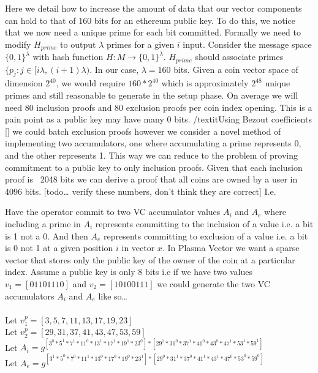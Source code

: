 \documentclass[11pt]{article}
\begin{document}
Here we detail how to increase the amount of data that our vector components can hold to that of 160 bits for an ethereum public key. To do this, we notice that we now need a unique prime for each bit committed. Formally we need to modify $H_{prime}$ to output $\lambda$ primes for a given $i$ input. Consider the message space $\{0,1\}^{\lambda}$ with hash function $H: M \rightarrow \{0,1\}^{\lambda}$. $H_{prime}$ should associate primes $\{p_j: j \in [i\lambda,(i+1)\lambda)$. In our case, $\lambda = 160$ bits. Given a coin vector space of dimension $2^{40}$, we would require $160*2^{40}$ which is approximately $2^{48}$ unique primes and still reasonable to generate in the setup phase. On average we will need 80 inclusion proofs and 80 exclusion proofs per coin index opening. This is a pain point as a public key may have many 0 bits. /textit{Using Bezout coefficients [] we could batch exclusion proofs however we consider a novel method of implementing two accumulators, one where accumulating a prime represents 0, and the other represents 1.} This way we can reduce to the problem of proving commitment to a public key to only inclusion proofs. Given that each inclusion proof is ~2048 bits we can derive a proof that all coins are owned by a user in 4096 bits. [todo… verify these numbers, don’t think they are correct] I.e.

Have the operator commit to two VC accumulator values $A_i$ and $A_e$ where including a prime in $A_i$ represents committing to the inclusion of a value i.e. a bit is 1 not a 0. And then $A_e$ represents committing to exclusion of a value i.e. a bit is 0 not 1 at a given position $i$ in vector $x$.
In Plasma Vector we want a sparse vector that stores only the public key of the owner of the coin at a particular index. Assume a public key is only 8 bits i.e if we have two values $v_1 = [01101110]$ and $v_2 = [10100111]$ we could generate the two VC accumulators $A_i$ and $A_e$ like so…
\\
\\
Let $v_1^p = [3,5,7,11,13,17,19,23]$
\\
Let $v_2^p = [29,31,37,41,43,47,53, 59]$
\\
Let $A_i = g^{[{3^0}*{5^1}*{7^1}*{11^0}*{13^1}*{17^1}*{19^1}*{23^0}]*[{29^1}*{31^0}*{37^1}*{41^0}*{43^0}*{47^1}*{53^1}*59^1]}$
\\
Let $A_e = g^{[{3^1}*{5^0}*{7^0}*{11^1}*{13^0}*{17^0}*{19^0}*{23^1}]*[{29^0}*{31^1}*{37^0}*{41^1}*{43^1}*{47^0}*{53^0}*59^0]}$
\\
\end{document}

